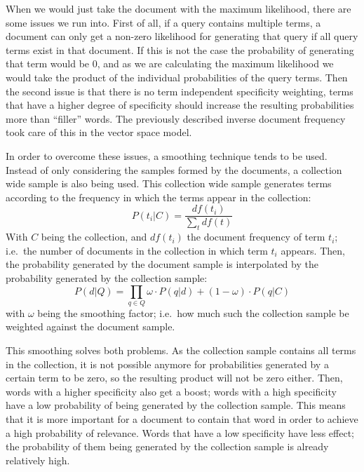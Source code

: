When we would just take the document with the maximum likelihood, there are some issues we run into. First of all, if a query contains multiple terms, a document can only get a non-zero likelihood for generating that query if all query terms exist in that document. If this is not the case the probability of generating that term would be 0, and as we are calculating the maximum likelihood we would take the product of the individual probabilities of the query terms. Then the second issue is that there is no term independent specificity weighting, terms that have a higher degree of specificity should increase the resulting probabilities more than ``filler'' words. The previously described inverse document frequency took care of this in the vector space model.

In order to overcome these issues, a smoothing technique tends to be used. Instead of only considering the samples formed by the documents, a collection wide sample is also being used. This collection wide sample generates terms according to the frequency in which the terms appear in the collection:
\begin{equation}
	P(t_i|C) = \frac{\mathit{df}(t_i)}{\sum_t \mathit{df}(t)}
\end{equation}
With $C$ being the collection, and $df(t_i)$ the document frequency of term $t_i$; i.e.\ the number of documents in the collection in which term $t_i$ appears. Then, the probability generated by the document sample is interpolated by the probability generated by the collection sample:
\begin{equation}
	P(d|Q) = \prod_{q \in Q} \omega \cdot P(q | d) + (1 - \omega) \cdot P(q | C) 
\end{equation}
with $\omega$ being the smoothing factor; i.e.\ how much such the collection sample be weighted against the document sample. 

This smoothing solves both problems. As the collection sample contains all terms in the collection, it is not possible anymore for probabilities generated by a certain term to be zero, so the resulting product will not be zero either. Then, words with a higher specificity also get a boost; words with a high specificity have a low probability of being generated by the collection sample. This means that it is more important for a document to contain that word in order to achieve a high probability of relevance. Words that have a low specificity have less effect; the probability of them being generated by the collection sample is already relatively high. 

